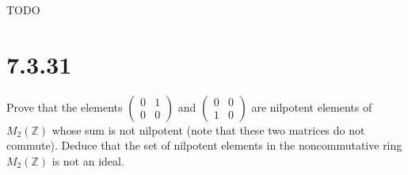 \documentclass[fleqn]{article}
\begin{document}
        TODO
    
    \section{7.3.31}
    Prove that the elements $\begin{pmatrix}
        0 & 1 \\
        0 & 0
    \end{pmatrix}$ and $\begin{pmatrix}
        0 & 0 \\
        1 & 0
    \end{pmatrix}$ are nilpotent elements of $M_2(\mathbb{Z})$ whose sum is not nilpotent (note that these two matrices do not commute).  Deduce that the set of nilpotent elements in the noncommutative ring $M_2(\mathbb{Z})$ is not an ideal.
        
\end{document}
